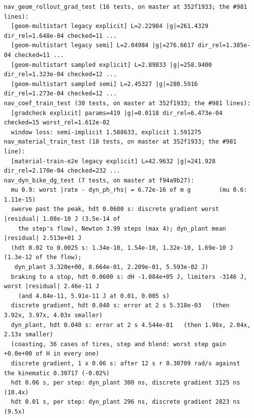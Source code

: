 \documentclass[11pt]{article}
\theoremstyle{remark}
\begin{document}
\begin{center}
\begin{minipage}{0.98\linewidth}
\scriptsize
\begin{verbatim}
nav_geom_rollout_grad_test (16 tests, on master at 352f1933; the #981 lines):
  [geom-multistart legacy explicit] L=2.22984 |g|=261.4329 dir_rel=1.648e-04 checked=11 ...
  [geom-multistart legacy semi] L=2.04984 |g|=276.6617 dir_rel=1.385e-04 checked=11 ...
  [geom-multistart sampled explicit] L=2.89833 |g|=258.9400 dir_rel=1.323e-04 checked=12 ...
  [geom-multistart sampled semi] L=2.45327 |g|=280.5916 dir_rel=1.273e-04 checked=12 ...
nav_coef_train_test (30 tests, on master at 352f1933; the #981 lines):
  [gradcheck explicit] params=419 |g|=0.0118 dir_rel=6.473e-04 checked=15 worst_rel=1.612e-02
  window loss: semi-implicit 1.588633, explicit 1.591275
nav_material_train_test (18 tests, on master at 352f1933; the #981 line):
  [material-train-e2e legacy explicit] L=42.9632 |g|=241.928 dir_rel=2.170e-04 checked=232 ...
nav_dyn_bike_dg_test (7 tests, on master at f94a9b27):
  mu 0.9: worst |rate - dyn_ph_rhs| = 6.72e-16 of m g        (mu 0.6: 1.11e-15)
  swerve past the peak, hdt 0.0600 s: discrete gradient worst |residual| 1.08e-10 J (3.5e-14 of
    the step's flow), Newton 3.99 steps (max 4); dyn_plant mean |residual| 2.513e+01 J
  (hdt 0.02 to 0.0025 s: 1.34e-10, 1.54e-10, 1.32e-10, 1.69e-10 J (1.3e-12 of the flow);
   dyn_plant 3.320e+00, 8.664e-01, 2.209e-01, 5.593e-02 J)
  braking to a stop, hdt 0.0600 s: dH -1.084e+05 J, limiters -3146 J, worst |residual| 2.46e-11 J
    (and 4.84e-11, 5.91e-11 J at 0.01, 0.005 s)
  discrete gradient, hdt 0.040 s: error at 2 s 5.318e-03   (then 3.92x, 3.97x, 4.03x smaller)
  dyn_plant, hdt 0.040 s: error at 2 s 4.544e-01   (then 1.98x, 2.04x, 2.13x smaller)
  (coasting, 36 cases of tires, step and blend: worst step gain +0.0e+00 of H in every one)
  discrete gradient, 1 x 0.06 s: after 12 s r 0.30709 rad/s against the kinematic 0.30717 (-0.02%)
  hdt 0.06 s, per step: dyn_plant 300 ns, discrete gradient 3125 ns (10.4x)
  hdt 0.01 s, per step: dyn_plant 296 ns, discrete gradient 2823 ns (9.5x)
\end{verbatim}
\end{minipage}
\end{center}
\end{document}
